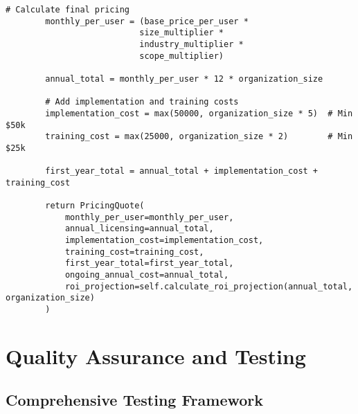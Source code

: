 \documentclass[10pt,twocolumn]{IEEEtran}
\begin{document}
\begin{lstlisting}[caption={CPF Licensing Framework}]
        # Calculate final pricing
        monthly_per_user = (base_price_per_user * 
                           size_multiplier * 
                           industry_multiplier * 
                           scope_multiplier)
        
        annual_total = monthly_per_user * 12 * organization_size
        
        # Add implementation and training costs
        implementation_cost = max(50000, organization_size * 5)  # Min $50k
        training_cost = max(25000, organization_size * 2)        # Min $25k
        
        first_year_total = annual_total + implementation_cost + training_cost
        
        return PricingQuote(
            monthly_per_user=monthly_per_user,
            annual_licensing=annual_total,
            implementation_cost=implementation_cost,
            training_cost=training_cost,
            first_year_total=first_year_total,
            ongoing_annual_cost=annual_total,
            roi_projection=self.calculate_roi_projection(annual_total, organization_size)
        )
\end{lstlisting}

\section{Quality Assurance and Testing}

\subsection{Comprehensive Testing Framework}
\end{document}
